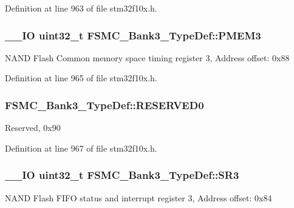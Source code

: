 Definition at line 963 of file stm32f10x.\-h.

\hypertarget{struct_f_s_m_c___bank3___type_def_a756258d9266b1eee3455bc850107beb6}{
\subsubsection[{P\-M\-E\-M3}]{\setlength{\rightskip}{0pt plus 5cm}\-\_\-\-\_\-\-I\-O {\bf uint32\-\_\-t} F\-S\-M\-C\-\_\-\-Bank3\-\_\-\-Type\-Def\-::\-P\-M\-E\-M3}}\label{struct_f_s_m_c___bank3___type_def_a756258d9266b1eee3455bc850107beb6}
N\-A\-N\-D Flash Common memory space timing register 3, Address offset\-: 0x88 

Definition at line 965 of file stm32f10x.\-h.

\hypertarget{struct_f_s_m_c___bank3___type_def_a2e9cac528ee7bfce11b0b9a36db3b954}{
\subsubsection[{R\-E\-S\-E\-R\-V\-E\-D0}]{ F\-S\-M\-C\-\_\-\-Bank3\-\_\-\-Type\-Def\-::\-R\-E\-S\-E\-R\-V\-E\-D0}}\label{struct_f_s_m_c___bank3___type_def_a2e9cac528ee7bfce11b0b9a36db3b954}
Reserved, 0x90 

Definition at line 967 of file stm32f10x.\-h.

\hypertarget{struct_f_s_m_c___bank3___type_def_ab89f16f64018a1f1e55d36f92b84be94}{
\subsubsection[{S\-R3}]{\setlength{\rightskip}{0pt plus 5cm}\-\_\-\-\_\-\-I\-O {\bf uint32\-\_\-t} F\-S\-M\-C\-\_\-\-Bank3\-\_\-\-Type\-Def\-::\-S\-R3}}\label{struct_f_s_m_c___bank3___type_def_ab89f16f64018a1f1e55d36f92b84be94}
N\-A\-N\-D Flash F\-I\-F\-O status and interrupt register 3, Address offset\-: 0x84 


